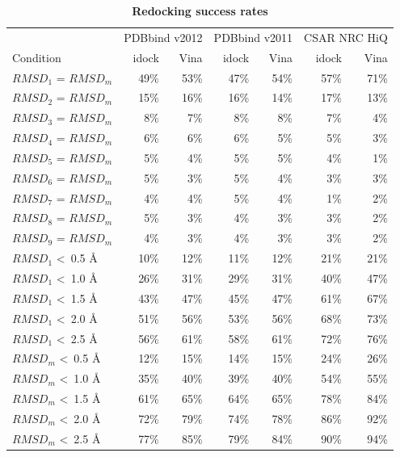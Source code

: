 \documentclass[10pt]{article}
\begin{document}
\begin{table}[!ht]
\caption{
\bf{Redocking success rates}}
\begin{tabular}{lrrrrrr}
\hline
& \multicolumn{2}{c}{PDBbind v2012} & \multicolumn{2}{c}{PDBbind v2011} & \multicolumn{2}{c}{CSAR NRC HiQ}\\
Condition & idock & Vina & idock & Vina & idock & Vina\\
\hline
$RMSD_1$ = $RMSD_m$ & 49\% & 53\% & 47\% & 54\% & 57\% & 71\%\\
$RMSD_2$ = $RMSD_m$ & 15\% & 16\% & 16\% & 14\% & 17\% & 13\%\\
$RMSD_3$ = $RMSD_m$ &  8\% &  7\% &  8\% &  8\% &  7\% &  4\%\\
$RMSD_4$ = $RMSD_m$ &  6\% &  6\% &  6\% &  5\% &  5\% &  3\%\\
$RMSD_5$ = $RMSD_m$ &  5\% &  4\% &  5\% &  5\% &  4\% &  1\%\\
$RMSD_6$ = $RMSD_m$ &  5\% &  3\% &  5\% &  4\% &  3\% &  3\%\\
$RMSD_7$ = $RMSD_m$ &  4\% &  4\% &  5\% &  4\% &  1\% &  2\%\\
$RMSD_8$ = $RMSD_m$ &  5\% &  3\% &  4\% &  3\% &  3\% &  2\%\\
$RMSD_9$ = $RMSD_m$ &  4\% &  3\% &  4\% &  3\% &  3\% &  2\%\\
\noalign{\smallskip}
$RMSD_1$ \textless\ 0.5 \AA & 10\% & 12\% & 11\% & 12\% & 21\% & 21\%\\
$RMSD_1$ \textless\ 1.0 \AA & 26\% & 31\% & 29\% & 31\% & 40\% & 47\%\\
$RMSD_1$ \textless\ 1.5 \AA & 43\% & 47\% & 45\% & 47\% & 61\% & 67\%\\
$RMSD_1$ \textless\ 2.0 \AA & 51\% & 56\% & 53\% & 56\% & 68\% & 73\%\\
$RMSD_1$ \textless\ 2.5 \AA & 56\% & 61\% & 58\% & 61\% & 72\% & 76\%\\
\noalign{\smallskip}
$RMSD_m$ \textless\ 0.5 \AA & 12\% & 15\% & 14\% & 15\% & 24\% & 26\%\\
$RMSD_m$ \textless\ 1.0 \AA & 35\% & 40\% & 39\% & 40\% & 54\% & 55\%\\
$RMSD_m$ \textless\ 1.5 \AA & 61\% & 65\% & 64\% & 65\% & 78\% & 84\%\\
$RMSD_m$ \textless\ 2.0 \AA & 72\% & 79\% & 74\% & 78\% & 86\% & 92\%\\
$RMSD_m$ \textless\ 2.5 \AA & 77\% & 85\% & 79\% & 84\% & 90\% & 94\%\\
\end{tabular}

\end{table}
\end{document}
